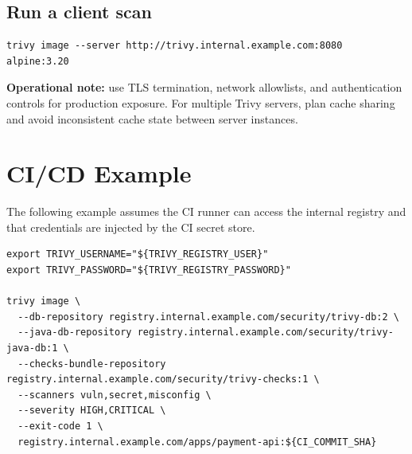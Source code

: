 \documentclass[10pt]{article}
\begin{document}
\subsection{Run a client scan}
\begin{lstlisting}[style=shell]
trivy image --server http://trivy.internal.example.com:8080 alpine:3.20
\end{lstlisting}

\textbf{Operational note:} use TLS termination, network allowlists, and authentication controls for production exposure. For multiple Trivy servers, plan cache sharing and avoid inconsistent cache state between server instances.

\section{CI/CD Example}
The following example assumes the CI runner can access the internal registry and that credentials are injected by the CI secret store.

\begin{lstlisting}[style=shell]
export TRIVY_USERNAME="${TRIVY_REGISTRY_USER}"
export TRIVY_PASSWORD="${TRIVY_REGISTRY_PASSWORD}"

trivy image \
  --db-repository registry.internal.example.com/security/trivy-db:2 \
  --java-db-repository registry.internal.example.com/security/trivy-java-db:1 \
  --checks-bundle-repository registry.internal.example.com/security/trivy-checks:1 \
  --scanners vuln,secret,misconfig \
  --severity HIGH,CRITICAL \
  --exit-code 1 \
  registry.internal.example.com/apps/payment-api:${CI_COMMIT_SHA}
\end{lstlisting}
\end{document}
